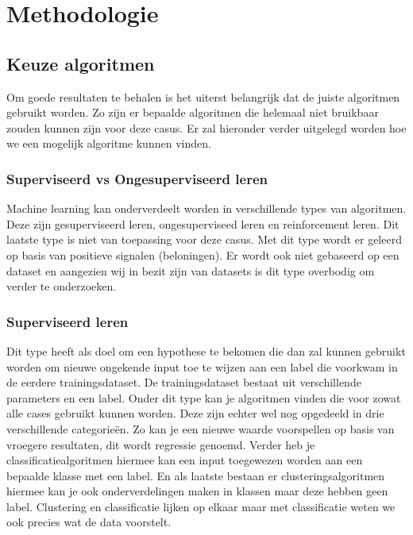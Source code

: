 
\chapter{Methodologie}
\label{ch:methodologie}



\section{Keuze algoritmen}
\label{sec:keuze-algoritmen}
Om goede resultaten te behalen is het uiterst belangrijk dat de juiste algoritmen gebruikt worden. Zo zijn er bepaalde algoritmen die helemaal niet bruikbaar zouden kunnen zijn voor deze casus. Er zal hieronder verder uitgelegd worden hoe we een mogelijk algoritme kunnen vinden.

\subsection{Superviseerd vs Ongesuperviseerd leren}
\label{sec: superviseerd-vs-ongesuperviseerd-leren}
Machine learning kan onderverdeelt worden in verschillende types van algoritmen. Deze zijn gesuperviseerd leren, ongesuperviseed leren en reinforcement leren. Dit laatste type is niet van toepassing voor deze casus. Met dit type wordt er geleerd op basis van positieve signalen (beloningen). Er wordt ook niet gebaseerd op een dataset en aangezien wij in bezit zijn van datasets is dit type overbodig om verder te onderzoeken. 

\subsection*{Superviseerd leren}
\label{sec: superviseerd-leren}
Dit type heeft als doel om een hypothese te bekomen die dan zal kunnen gebruikt worden om nieuwe ongekende input toe te wijzen aan een label die voorkwam in de eerdere trainingsdataset. De trainingsdataset bestaat uit verschillende parameters en een label. Onder dit type kan je algoritmen vinden die voor zowat alle cases gebruikt kunnen worden. Deze zijn echter wel nog opgedeeld in drie verschillende categorieën. Zo kan je een nieuwe waarde voorspellen op basis van vroegere resultaten, dit wordt regressie genoemd. Verder heb je classificatiealgoritmen hiermee kan een input toegewezen worden aan een bepaalde klasse met een label. En als laatste bestaan er clusteringsalgoritmen hiermee kan je ook onderverdelingen maken in klassen maar deze hebben geen label. Clustering en classificatie lijken op elkaar maar met classificatie weten we ook precies wat de data voorstelt. 

